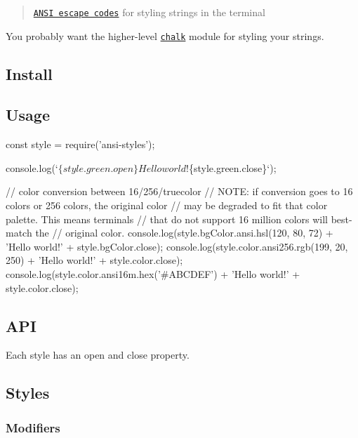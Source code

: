 \begin{quote}
\href{http://en.wikipedia.org/wiki/ANSI_escape_code#Colors_and_Styles}{\tt A\+N\+SI escape codes} for styling strings in the terminal \end{quote}


You probably want the higher-\/level \href{https://github.com/chalk/chalk}{\tt chalk} module for styling your strings.



\subsection*{Install}




\subsection*{Usage}


\begin{DoxyCode}
const style = require('ansi-styles');

console.log(`$\{style.green.open\}Hello world!$\{style.green.close\}`);


// color conversion between 16/256/truecolor
// NOTE: if conversion goes to 16 colors or 256 colors, the original color
//       may be degraded to fit that color palette. This means terminals
//       that do not support 16 million colors will best-match the
//       original color.
console.log(style.bgColor.ansi.hsl(120, 80, 72) + 'Hello world!' + style.bgColor.close);
console.log(style.color.ansi256.rgb(199, 20, 250) + 'Hello world!' + style.color.close);
console.log(style.color.ansi16m.hex('#ABCDEF') + 'Hello world!' + style.color.close);
\end{DoxyCode}


\subsection*{A\+PI}

Each style has an {\ttfamily open} and {\ttfamily close} property.

\subsection*{Styles}

\subsubsection*{Modifiers}


